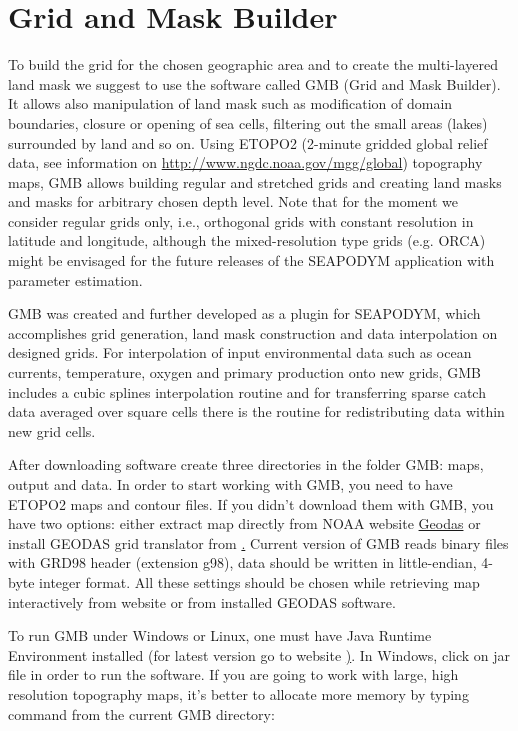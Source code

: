 \section{Grid and Mask Builder}\label{sec:GMB}

To build the grid for the chosen geographic area and to create the multi-layered land mask we suggest to use the software called GMB (Grid and Mask Builder). It allows also manipulation of land mask such as modification of domain boundaries, closure or opening of sea cells, filtering out the small areas (lakes) surrounded by land and so on. Using ETOPO2 (2-minute gridded global relief data, see information on \url{http://www.ngdc.noaa.gov/mgg/global}) topography maps, GMB allows building regular and stretched grids and creating land masks and masks for arbitrary chosen depth level. Note that for the moment we consider regular grids only, i.e., orthogonal grids with constant resolution in latitude and longitude, although the mixed-resolution type grids (e.g. ORCA) might be envisaged for the future releases of the SEAPODYM application with parameter estimation.

GMB was created and further developed as a plugin for SEAPODYM, which accomplishes grid generation, land mask construction and data interpolation on designed grids. For interpolation of input environmental data such as ocean currents, temperature, oxygen and primary production onto new grids, GMB includes a cubic splines interpolation routine and for transferring sparse catch data averaged over square cells there is the routine for redistributing data within new grid cells.

After downloading software create three directories in the folder GMB: {\ttfamily maps, output} and {\ttfamily data}. In order to start working with GMB, you need to have ETOPO2 maps and contour files. If you didn't download them with GMB, you have two options: either extract map directly from NOAA website \href{http://www.ngdc.noaa.gov/mgg/gdas/gd_designagrid.html}{Geodas} or install GEODAS grid translator from \href{http://www.ngdc.noaa.gov/mgg/geodas/geodas.html}. Current version of GMB reads binary files with GRD98 header (extension g98), data should be written in little-endian, 4-byte integer format. All these settings should be chosen while retrieving map interactively from website or from installed GEODAS software.

To run GMB under Windows or Linux, one must have Java Runtime Environment installed (for latest version go to website \href{http://java.sun.com/j2se/1.5.0/download.jsp}). In Windows, click on jar file in order to run the software. If you are going to work with large, high resolution topography maps, it's better to allocate more memory by typing command from the current GMB directory:

